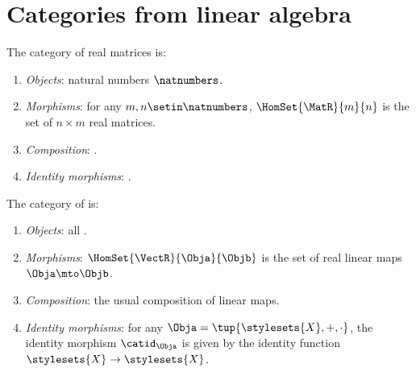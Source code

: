 
\section[Categories from linear algebra]{Categories from linear algebra}
\label{sec:cats-of-linear-algebra}

\begin{ctdefinition}
    \label{def:cat-of-real-matrices}
    The category \MatR of real matrices is:
    \begin{enumerate}
        \item \emph{Objects}: natural numbers $\natnumbers$.
        \item \emph{Morphisms}: for any $m, n \setin \natnumbers$, $\HomSet{\MatR}{m}{n}$ is the set  of $n \times m$ real matrices.
        \item \emph{Composition}: .
        \item \emph{Identity morphisms}: .
    \end{enumerate}
\end{ctdefinition}

\begin{ctdefinition}
    \label{def:cat-of-real-vector-spaces}
    The category \VectR of  is:
    \begin{enumerate}
        \item \emph{Objects}: all .
        \item \emph{Morphisms}: $\HomSet{\VectR}{\Obja}{\Objb}$ is the set of real linear maps $\Obja \mto \Objb$.
        \item \emph{Composition}: the usual composition of linear maps.
        \item \emph{Identity morphisms}: for any  $\Obja = \tup{\stylesets{X}, +,{{ \cdot}}}$, the identity morphism $\catid_\Obja$ is given by the identity function $\stylesets{X} \to \stylesets{X}$.
    \end{enumerate}
\end{ctdefinition}

